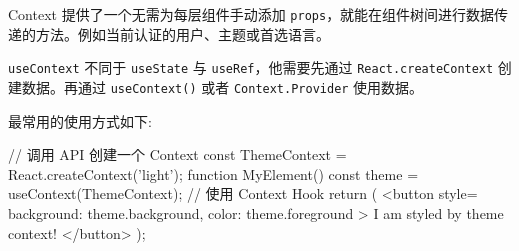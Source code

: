 Context 提供了一个无需为每层组件手动添加 \texttt{props}，就能在组件树间进行数据传递的方法。例如当前认证的用户、主题或首选语言。

\texttt{useContext} 不同于 \texttt{useState} 与 \texttt{useRef}，他需要先通过 \texttt{React.createContext} 创建数据。再通过 \texttt{useContext()} 或者 \texttt{Context.Provider} 使用数据。

最常用的使用方式如下:

\begin{JavaScript}
// 调用 API 创建一个 Context
const ThemeContext = React.createContext('light');
function MyElement() {
  const theme = useContext(ThemeContext); // 使用 Context Hook
  return (
    <button style={{ background: theme.background, color: theme.foreground }}>
      I am styled by theme context!
    </button>
  );
}
\end{JavaScript}

